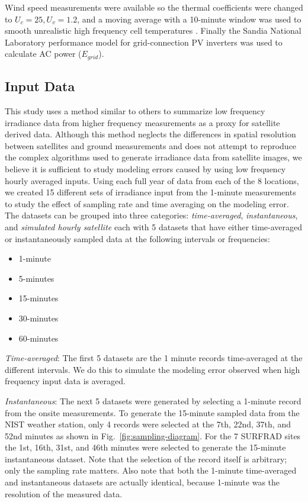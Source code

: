 \documentclass[conference]{IEEEtran}
\begin{document}
Wind speed measurements were available so the thermal coefficients were changed to $U_c=25, U_v=1.2$, and a moving average with a 10-minute window was used to smooth unrealistic high frequency cell temperatures \cite{9095219}. Finally the Sandia National Laboratory performance model for grid-connection PV inverters \cite{King2007} was used to calculate AC power ($E_{grid}$).

\subsection{Input Data}
This study uses a method similar to others to summarize low frequency irradiance data from higher frequency measurements \cite{Bowersox2021,osti_1797569} as a proxy for satellite derived data. Although this method neglects the differences in spatial resolution between satellites and ground measurements and does not attempt to reproduce the complex algorithms used to generate irradiance data from satellite images, we believe it is sufficient to study modeling errors caused by using low frequency hourly averaged inputs. Using each full year of data from each of the 8 locations, we created 15 different sets of irradiance input from the 1-minute measurements to study the effect of sampling rate and time averaging on the modeling error. The datasets can be grouped into three categories: \emph{time-averaged}, \emph{instantaneous}, and \emph{simulated hourly satellite} each with 5 datasets that have either time-averaged or instantaneously sampled data at the following intervals or frequencies:

\begin{itemize}
    \item 1-minute
    \item 5-minutes
    \item 15-minutes
    \item 30-minutes
    \item 60-minutes
\end{itemize}

\emph{Time-averaged}: The first 5 datasets are the 1 minute records time-averaged at the different intervals. We do this to simulate the modeling error observed when high frequency input data is averaged.

\emph{Instantaneous}: The next 5 datasets were generated by selecting a 1-minute record from the onsite measurements. To generate the 15-minute sampled data from the NIST weather station, only 4 records were selected at the 7th, 22nd, 37th, and 52nd minutes as shown in Fig.~\ref{fig:sampling-diagram}. For the 7 SURFRAD sites the 1st, 16th, 31st, and 46th minutes were selected to generate the 15-minute instantaneous dataset. Note that the selection of the record itself is arbitrary; only the sampling rate matters. Also note that both the 1-minute time-averaged and instantaneous datasets are actually identical, because 1-minute was the resolution of the measured data.
\end{document}

